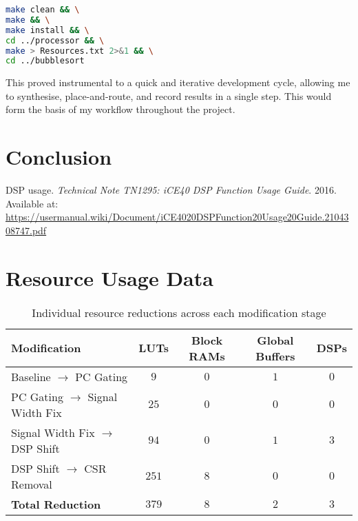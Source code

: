 \documentclass[a4paper,10pt]{article}
\begin{document}
\begin{lstlisting}[language=bash,
    caption={Workflow used to synthesise and record results},
    label={prog:Workflow}]
make clean && \
make && \
make install && \
cd ../processor && \
make > Resources.txt 2>&1 && \
cd ../bubblesort
\end{lstlisting}

This proved instrumental to a quick and iterative development cycle, 
allowing me to synthesise, place-and-route, and record results in a single step.
This would form the basis of my workflow throughout the project.


\section{Conclusion}
\label{sec:Conclusion}

\begin{thebibliography}{9}

\bibitem{DSP_guide}
DSP usage. \textit{Technical Note TN1295: iCE40 DSP Function Usage Guide}. 
2016. Available at: 
\url{https://usermanual.wiki/Document/iCE4020DSPFunction20Usage20Guide.2104308747.pdf}

\end{thebibliography}

\newpage
\appendix
\section{Resource Usage Data}

\begin{table}[H] 
    \centering
    \begin{tabularx}{0.85\textwidth}{X c c c c}
        \toprule
        Modification & LUTs & Block RAMs & Global Buffers & DSPs \\ \midrule
        Baseline $\rightarrow$ PC Gating & $9$ & $0$ & $1$ & $0$ \\
        PC Gating $\rightarrow$ Signal Width Fix & $25$ & $0$ & $0$ & $0$ \\
        Signal Width Fix $\rightarrow$ DSP Shift & $94$ & $0$ & $1$ & $3$ \\
        DSP Shift $\rightarrow$ CSR Removal & $251$ & $8$ & $0$ & $0$ \\ \midrule
        \textbf{Total Reduction} & \textbf{$379$} & \textbf{$8$} & \textbf{$2$} & \textbf{$3$} \\
        \bottomrule
    \end{tabularx}
    \caption{Individual resource reductions across each modification stage}
    \label{tab:modification_reductions}
\end{table}
\end{document}
